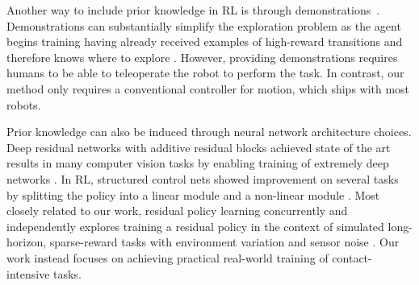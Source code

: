 Another way to include prior knowledge in RL is through demonstrations~\cite{peters2008baseball, kober2008mp, rajeswaran2018dextrous, hester17dqfd, vecerik17ddpgfd, nair2018demonstrations}. Demonstrations can substantially simplify the exploration problem as the agent begins training having already received examples of high-reward transitions and therefore knows where to explore \cite{subramanian2016efd}. However, providing demonstrations requires humans to be able to teleoperate the robot to perform the task. In contrast, our method only requires a conventional controller for motion, which ships with most robots.

Prior knowledge can also be induced through neural network architecture choices. Deep residual networks with additive residual blocks achieved state of the art results in many computer vision tasks by enabling training of extremely deep networks \cite{he2016resnet}. In RL, structured control nets showed improvement on several tasks by splitting the policy into a linear module and a non-linear module \cite{srouji18structuredcontrolnets}. Most closely related to our work, residual policy learning concurrently and independently explores training a residual policy in the context of simulated long-horizon, sparse-reward tasks with environment variation and sensor noise \cite{silver18residualpolicylearning}. Our work instead focuses on achieving practical real-world training of contact-intensive tasks.
